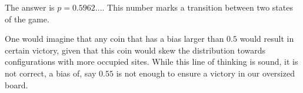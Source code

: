 The answer is $p=0.5962...$. This number marks a transition between two states
of the game.

One would imagine that any coin that has a bias larger than $0.5$ would result
in certain victory, given that this coin would skew the distribution towards
configurations with more occupied sites. While this line of thinking is sound,
it is not correct, a bias of, say $0.55$ is not enough to ensure a victory
in our oversized board.
